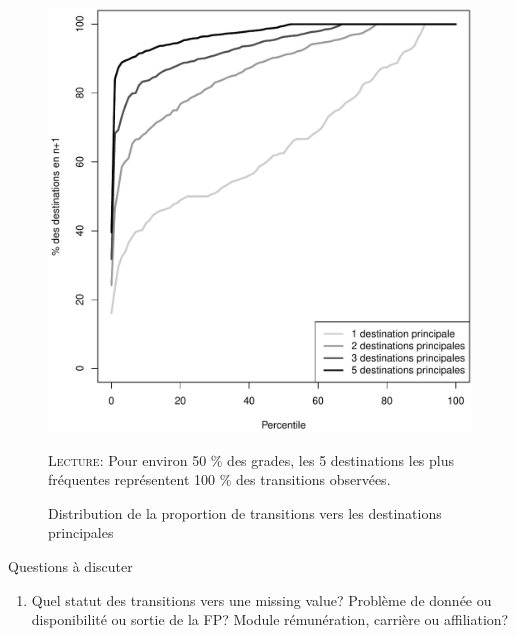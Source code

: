\documentclass[11pt,a4paper]{article}
\begin{document}
\begin{figure}[t]
  \label{pct}
\caption{Distribution de la proportion de transitions vers les destinations principales}
\vspace{-0.1cm}
\centering
  \includegraphics[width=0.7\linewidth]{../../bordeaux/results/pct.pdf}
\vspace{0.1cm}  
\begin{minipage}{12cm}%
\small \textsc{Lecture:} Pour environ 50 \% des grades, les 5 destinations les plus fréquentes représentent 100 \% des transitions observées.  
 \end{minipage}%
\end{figure}


Questions à discuter
\begin{enumerate}[leftmargin=1cm ,parsep=0cm,itemsep=0cm,topsep=0cm] 
\item Quel statut des transitions vers une missing value? Problème de donnée ou disponibilité ou sortie de la FP? Module rémunération, carrière ou affiliation? 
\end{enumerate}




\ifx\isEmbedded\undefined
\newpage
 

\end{document}
